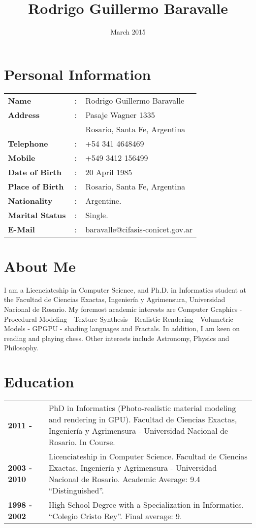 \documentclass[a4paper,12pt]{article}
\title{Rodrigo Guillermo Baravalle}
\date{March 2015}
\begin{document}
\maketitle
\section*{Personal Information}

\begin{tabular}{lcl}
\bf{Name} &:& Rodrigo Guillermo Baravalle\\
\bf{Address} &:& Pasaje Wagner 1335\\ &\ & Rosario, Santa Fe, Argentina\\
\bf{Telephone}&:&+54 341 4648469\\
\bf{Mobile} &:& +549 3412 156499 \\
\bf{Date of Birth} &:& 20 April 1985\\
\bf{Place of Birth} &:& Rosario, Santa Fe, Argentina\\
\bf{Nationality} &:& Argentine.\\
\bf{Marital Status} &:& Single.\\
\bf{E-Mail}&:&baravalle@cifasis-conicet.gov.ar\\
\end{tabular}

\section*{About Me}
\begin{small}
\noindent
I am a Licenciateship in Computer Science, and Ph.D. in Informatics student at the Facultad de Ciencias Exactas, Ingenier\'ia y Agrimensura, Universidad Nacional de Rosario.
My foremost academic interests are Computer Graphics - Procedural Modeling - Texture Synthesis - Realistic Rendering - Volumetric Models - GPGPU - shading languages and Fractals. 
In addition, I am keen on reading and playing chess.
Other interests include Astronomy, Physics and Philosophy.
\end{small}


\section*{Education}

\begin{tabular}{lcp{9 cm}}
		\bf{2011 - } & & PhD in Informatics (Photo-realistic material modeling and rendering in GPU). Facultad de Ciencias Exactas, Ingenier\'ia y Agrimensura - Universidad Nacional de Rosario. In Course.\\
		\bf{2003 - 2010} & & Licenciateship in Computer Science. Facultad de Ciencias Exactas, Ingenier\'ia y Agrimensura - Universidad Nacional de Rosario. Academic Average: 9.4 ``Distinguished''.\\
		\bf{1998 - 2002} & & High School Degree with a Specialization in Informatics. ``Colegio Cristo Rey''. Final average: 9.\\
\end{tabular}
\end{document}
